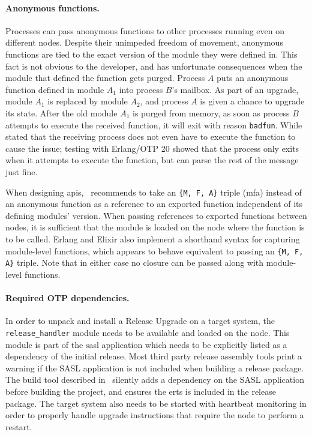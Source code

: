 \paragraph{Anonymous functions.}
Processes can pass anonymous functions to other processes running even on different nodes. Despite their unimpeded freedom of movement, anonymous functions are tied to the exact version of the module they were defined in. This fact is not obvious to the developer, and has unfortunate consequences when the module that defined the function gets purged. Process $A$ puts an anonymous function defined in module $A_1$ into process $B$'s mailbox. As part of an upgrade, module $A_1$ is replaced by module $A_2$, and process $A$ is given a chance to upgrade its state. After the old module $A_1$ is purged from memory, as soon as process $B$ attempts to execute the received function, it will exit with reason \lstinline|badfun|. While~\cite{davis:talk} stated that the receiving process does not even have to execute the function to cause the issue; testing with Erlang/OTP 20 showed that the process only exits when it attempts to execute the function, but can parse the rest of the message just fine.

When designing \acrshort{api}s,~\cite{davis:talk} recommends to take an \lstinline|{M, F, A}| triple (\acrlong{mfa}) instead of an anonymous function as a reference to an exported function independent of its defining modules' version. When passing references to exported functions between nodes, it is sufficient that the module is loaded on the node where the function is to be called. Erlang and Elixir also implement a shorthand syntax for capturing module-level functions, which appears to behave equivalent to passing an \lstinline|{M, F, A}| triple. Note that in either case no closure can be passed along with module-level functions.


\paragraph{Required OTP dependencies.}
In order to unpack and install a Release Upgrade on a target system, the \lstinline|release_handler| module needs to be available and loaded on the node. This module is part of the \acrfull{sasl} application which needs to be explicitly listed as a dependency of the initial release. Most third party release assembly tools print a warning if the SASL application is not included when building a release package.
The build tool described in~\cite{zak18} silently adds a dependency on the SASL application before building the project, and ensures the \acrshort{erts} is included in the release package.
The target system also needs to be started with heartbeat monitoring in order to properly handle upgrade instructions that require the node to perform a restart.~\cite{doc:otp}

